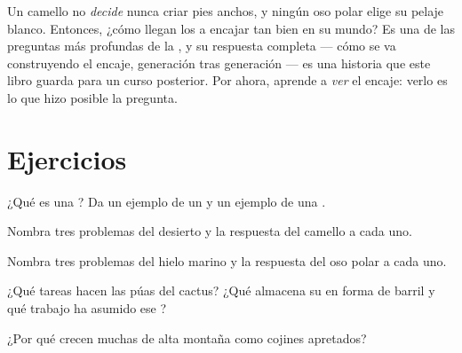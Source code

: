 \begin{remark}\label{rem:g4:adapted-to-their-world:how}
Un camello no \emph{decide} nunca criar pies anchos, y ningún oso
polar elige su pelaje blanco. Entonces, ¿cómo llegan los  a
encajar tan bien en su mundo? Es una de las preguntas más profundas de
la , y su respuesta completa --- cómo se va construyendo el
encaje, generación tras generación --- es una historia que este libro
guarda para un curso posterior. Por ahora, aprende a \emph{ver} el
encaje: verlo es lo que hizo posible la pregunta.
\end{remark}

\section{Ejercicios}

\begin{exercise}[$\star$]\label{exo:g4:adapted-to-their-world:1}
¿Qué es una ? Da un ejemplo de un  y un ejemplo de una
.
\end{exercise}

\begin{exercise}[$\star$]\label{exo:g4:adapted-to-their-world:2}
Nombra tres problemas del desierto y la respuesta del camello a cada uno.
\end{exercise}

\begin{exercise}[$\star$]\label{exo:g4:adapted-to-their-world:3}
Nombra tres problemas del hielo marino y la respuesta del oso polar a
cada uno.
\end{exercise}

\begin{exercise}[$\star$]\label{exo:g4:adapted-to-their-world:4}
¿Qué tareas hacen las púas del cactus? ¿Qué almacena su  en forma
de barril y qué trabajo ha asumido ese ?
\end{exercise}

\begin{exercise}[$\star$]\label{exo:g4:adapted-to-their-world:5}
¿Por qué crecen muchas  de alta montaña como cojines apretados?
\end{exercise}

